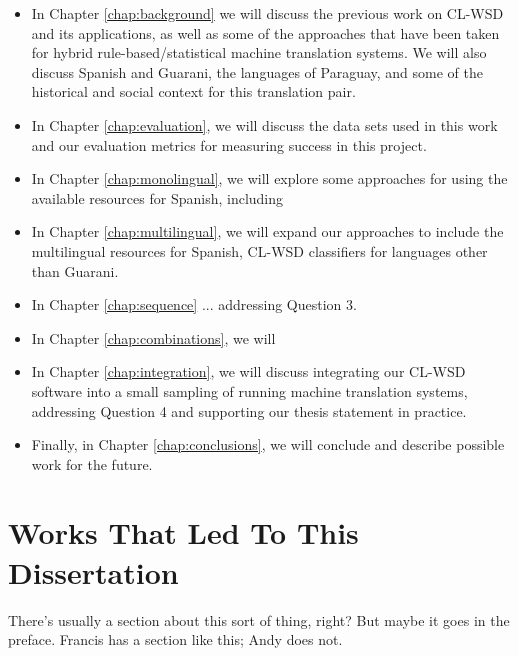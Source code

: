 \begin{itemize}
\item In Chapter \ref{chap:background} we will discuss the previous work on
CL-WSD and its applications, as well as some of the approaches that have been
taken for hybrid rule-based/statistical machine translation systems. We will
also discuss Spanish and Guarani, the languages of Paraguay, and some of the
historical and social context for this translation pair.
\item In Chapter \ref{chap:evaluation}, we will discuss the data sets used in
this work and our evaluation metrics for measuring success in this project.
\item In Chapter \ref{chap:monolingual}, we will explore some approaches for
using the available resources for Spanish, including 
\item In Chapter \ref{chap:multilingual}, we will expand our approaches to
include the multilingual resources for Spanish, CL-WSD classifiers for
languages other than Guarani.
\item In Chapter \ref{chap:sequence} ... addressing Question 3.
\item In Chapter \ref{chap:combinations}, we will 
\item In Chapter \ref{chap:integration}, we will discuss integrating our CL-WSD
software into a small sampling of running machine translation systems,
addressing Question 4 and supporting our thesis statement in practice.
\item Finally, in Chapter \ref{chap:conclusions}, we will conclude and describe
possible work for the future.
\end{itemize}

\section{Works That Led To This Dissertation}
There's usually a section about this sort of thing, right?
But maybe it goes in the preface.
Francis has a section like this; Andy does not.
